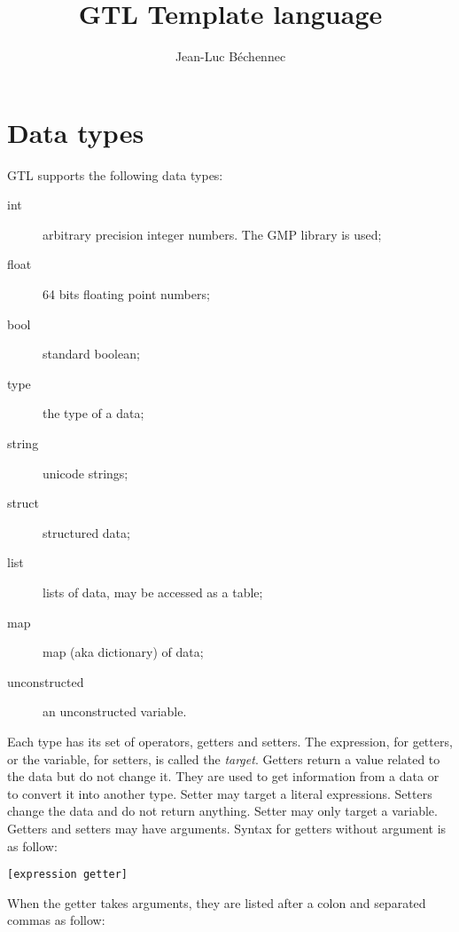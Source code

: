 \documentclass[11pt]{article}
\title{GTL Template language}
\author{Jean-Luc B\'echennec}
\begin{document}
\maketitle

\tableofcontents

\newpage
\section{Data types}

GTL supports the following data types:
\begin{description}
\item[int] arbitrary precision integer numbers. The GMP library is used;
\item[float] 64 bits floating point numbers;
\item[bool] standard boolean;
\item[type] the type of a data;
\item[string] unicode strings;
\item[struct] structured data;
\item[list] lists of data, may be accessed as a table;
\item[map] map (aka dictionary) of data;
\item[unconstructed] an unconstructed variable.
\end{description}

Each type has its set of operators, getters and setters. The expression, for getters, or the variable, for setters, is called the {\em target}. Getters return a value related to the data but do not change it. They are used to get information from a data or to convert it into another type. Setter may target a literal expressions. Setters change the data and do not return anything. Setter may only target a variable. Getters and setters may have arguments. Syntax for getters without argument is as follow:

\begin{lstlisting}[language=goilTemplate]
[expression getter]
\end{lstlisting}

When the getter takes arguments, they are listed after a colon and separated commas as follow:
\end{document}
